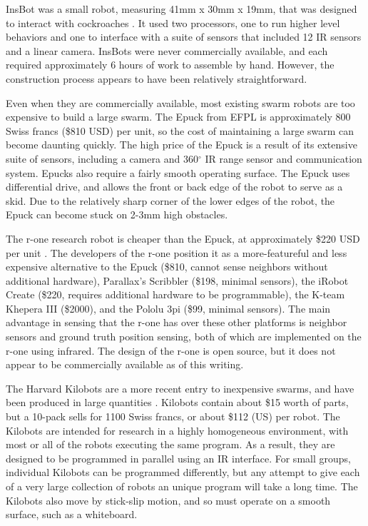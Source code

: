 \documentclass[]{article}
\begin{document}
InsBot was a small robot, measuring 41mm x 30mm x 19mm, that was designed to interact with cockroaches \cite{colot2004insbot}.
It used two processors, one to run higher level behaviors and one to interface with a suite of sensors that included 12 IR sensors and a linear camera. 
InsBots were never commercially available, and each required approximately 6 hours of work to assemble by hand. 
However, the construction process appears to have been relatively straightforward. 

Even when they are commercially available, most existing swarm robots are too expensive to build a large swarm.
The Epuck from EFPL is approximately 800 Swiss francs (\$810 USD) per unit, so the cost of maintaining a large swarm can become daunting quickly. 
The high price of the Epuck is a result of its extensive suite of sensors, including a camera and 360$^{\circ}$ IR range sensor and communication system. 
Epucks also require a fairly smooth operating surface.
The Epuck uses differential drive, and allows the front or back edge of the robot to serve as a skid. 
Due to the relatively sharp corner of the lower edges of the robot, the Epuck can become stuck on 2-3mm high obstacles. 

The r-one research robot is cheaper than the Epuck, at approximately \$220 USD per unit \cite{mclurkin2013low}. 
The developers of the r-one position it as a more-featureful and less expensive alternative to the Epuck (\$810, cannot sense neighbors without additional hardware), Parallax's Scribbler (\$198, minimal sensors), the iRobot Create (\$220, requires additional hardware to be programmable), the K-team Khepera III (\$2000), and the Pololu 3pi (\$99, minimal sensors). The main advantage in sensing that the r-one has over these other platforms is neighbor sensors and ground truth position sensing, both of which are implemented on the r-one using infrared.
The design of the r-one is open source, but it does not appear to be commercially available as of this writing.   

The Harvard Kilobots are a more recent entry to inexpensive swarms, and have been produced in large quantities \cite{rubenstein2014kilobot}. 
Kilobots contain about \$15 worth of parts, but a 10-pack sells for 1100 Swiss francs, or about \$112 (US) per robot. 
The Kilobots are intended for research in a highly homogeneous environment, with most or all of the robots executing the same program. 
As a result, they are designed to be programmed in parallel using an IR interface. 
For small groups, individual Kilobots can be programmed differently, but any attempt to give each of a very large collection of robots an unique program will take a long time. 
The Kilobots also move by stick-slip motion, and so must operate on a smooth surface, such as a whiteboard. 
\end{document}
